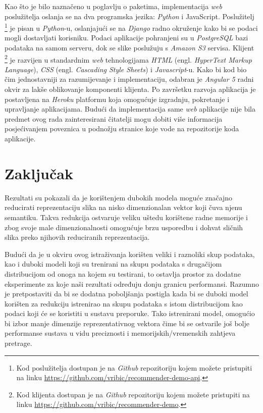 \documentclass[times, utf8, proizvoljni, numeric]{fer}
\begin{document}
Kao što je bilo naznačeno u poglavlju o paketima, implementacija \textit{web} poslužitelja oslanja se na dva programska jezika: \textit{Python} i JavaScript. Poslužitelj \footnote{Kod poslužitelja dostupan je na \textit{Github} repozitoriju kojem možete pristupiti na linku \url{https://github.com/vribic/recommender-demo-api}.} je pisan u \textit{Python}-u, oslanjajući se na \textit{Django} radno okruženje kako bi se podaci mogli dostavljati korisniku. Podaci aplikacije pohranjeni su u \textit{PostgreSQL} bazi podataka na samom serveru, dok se slike poslužuju s \textit{Amazon S3} servisa. Klijent \footnote{Kod klijenta dostupan je na \textit{Github} repozitoriju kojem možete pristupiti na linku \url{https://github.com/vribic/recommender-demo}.} je razvijen u standardnim \textit{web} tehnologijama \textit{HTML} (engl. \textit{HyperText Markup Language}), \textit{CSS} (engl. \textit{Cascading Style Sheets}) i \textit{Javascript}-u. Kako bi kod bio čim jednostavniji za razumijevanje i implementaciju, odabran je \textit{Angular 5} radni okvir za lakše oblikovanje komponenti klijenta. Po završetku razvoja aplikacija je postavljena na \textit{Heroku} platformu koja omogućuje izgradnju, pokretanje i upravljanje aplikacijama. Budući da implementacija same \textit{web} aplikacije nije bila predmet ovog rada zainteresirani čitatelji mogu dobiti više informacija posjećivanjem poveznica u podnožju stranice koje vode na repozitorije koda aplikacije.



\chapter{Zaključak}

Rezultati su pokazali da je korištenjem dubokih modela moguće značajno reducirati reprezentaciju slika na nisko dimenzionalan vektor koji čuva njenu semantiku. Takva redukcija ostvaruje veliku uštedu korištene radne memorije i zbog svoje male dimenzionalnosti omogućuje brzu usporedbu i dohvat sličnih slika preko njihovih reduciranih reprezentacija. 

Budući da je u okviru ovog istraživanja korišten veliki i raznoliki skup podataka, kao i duboki modeli koji su trenirani na skupu podataka s drugačijom distribucijom od onoga na kojem su testirani, to ostavlja prostor za dodatne eksperimente za koje naši rezultati određuju donju granicu performansi. Razumno je pretpostaviti da bi se dodatna poboljšanja postigla kada bi se duboki model korišten za redukciju istrenirao na skupu podataka s istom distribucijom kao podaci koji će se koristiti u sustavu preporuke. Tako istrenirani model, omogućio bi izbor manje dimenzije reprezentativnog vektora čime bi se ostvarile još bolje performanse sustava u vidu preciznosti i memorijskih/vremenskih zahtjeva pretrage.
\end{document}
